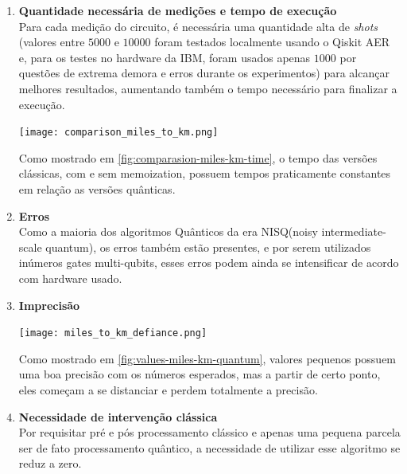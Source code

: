 \documentclass{article}
\begin{document}
\begin{enumerate}

\item{\textbf{Quantidade necessária de medições e tempo de execução}}\\
Para cada medição do circuito, é necessária uma quantidade alta de \emph{shots} (valores entre $5000$ e $10000$ foram testados localmente usando o Qiskit AER e, para os testes no hardware da IBM, foram usados apenas $1000$ por questões de extrema demora e erros durante os experimentos) para alcançar melhores resultados, aumentando também o tempo necessário para finalizar a execução.

\begin{center}
	\texttt{[image: comparison\_miles\_to\_km.png]}
	\label{fig:comparasion-miles-km-time}
\end{center}

Como mostrado em \ref{fig:comparasion-miles-km-time}, o tempo das versões clássicas, com e sem memoization, possuem tempos praticamente constantes em relação as versões quânticas.


\item{\textbf{Erros}}\\
Como a maioria dos algoritmos Quânticos da era NISQ(noisy intermediate-scale quantum), os erros também estão presentes, e por serem utilizados inúmeros gates multi-qubits, esses erros podem ainda se intensificar de acordo com hardware usado.

\item{\textbf{Imprecisão}}\\
\begin{center}
	\texttt{[image: miles\_to\_km\_defiance.png]}
	\label{fig:values-miles-km-quantum}
\end{center}

Como mostrado em \ref{fig:values-miles-km-quantum}, valores pequenos possuem uma boa precisão com os números esperados, mas a partir de certo ponto, eles começam a se distanciar e perdem totalmente a precisão.

\item{\textbf{Necessidade de intervenção clássica}}\\
Por requisitar pré e pós processamento clássico e apenas uma pequena parcela ser de fato processamento quântico, a necessidade de utilizar esse algoritmo se reduz a zero. 

\end{enumerate}
\end{document}
